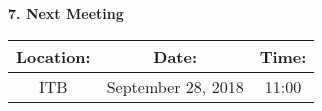 \documentclass[12pt]{article}
\begin{document}
\begin{flushleft}
\begin{itemize}
\end{itemize}

\textbf{7. Next Meeting}\\
\begin{center}
 \begin{tabular}{|c | c | c |} 
\hline
 Location: & Date: & Time: \\ 
 \hline
 ITB & September 28, 2018 & 11:00\\
\hline
\end{tabular}
\end{center}

\end{flushleft}
\end{document}
